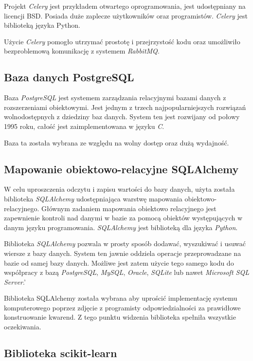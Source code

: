 \documentclass[../thesis.tex]{subfiles}
\begin{document}
Projekt \emph{Celery} jest przykładem otwartego oprogramowania, jest udostępniany na licencji BSD. Posiada duże zaplecze użytkowników oraz programistów. \emph{Celery} jest biblioteką języka Python.

Użycie \emph{Celery} pomogło utrzymać prostotę i przejrzystość kodu oraz umożliwiło bezproblemową komunikację z systemem \emph{RabbitMQ}.

\subsection{Baza danych PostgreSQL}

Baza \emph{PostgreSQL} jest systemem zarządzania relacyjnymi bazami danych z rozszerzeniami obiektowymi. Jest jednym z trzech najpopularniejszych rozwiązań wolnodostępnych z dziedziny baz danych. System ten jest rozwijany od połowy 1995 roku, całość jest zaimplementowana w języku \emph{C}.

Baza ta została wybrana ze względu na wolny dostęp oraz dużą wydajność.

\subsection{Mapowanie obiektowo-relacyjne SQLAlchemy}

W celu uproszczenia odczytu i zapisu wartości do bazy danych, użyta została biblioteka \emph{SQLAlchemy} udostępniająca warstwę mapowania obiektowo-relacyjnego. Głównym zadaniem mapowania obiektowo relacyjnego jest zapewnienie kontroli nad danymi w bazie za pomocą obiektów występujących w danym języku programowania. \emph{SQLAlchemy} jest biblioteką dla języka \emph{Python}.

Biblioteka \emph{SQLAlchemy} pozwala w prosty sposób dodawać, wyszukiwać i usuwać wiersze z bazy danych. System ten jawnie oddziela operacje przeprowadzane na bazie od samej bazy danych. Możliwe jest zatem użycie tego samego kodu do współpracy z bazą \emph{PostgreSQL}, \emph{MySQL}, \emph{Oracle}, \emph{SQLite} lub nawet\emph{ Microsoft SQL Server}.'


Biblioteka SQLAlchemy została wybrana aby uprościć implementację systemu komputerowego poprzez zdjęcie z programisty odpowiedzialności za prawidłowe konstruowanie kwarend. Z tego punktu widzenia biblioteka spełniła wszystkie oczekiwania.

\subsection{Biblioteka scikit-learn}
\end{document}
